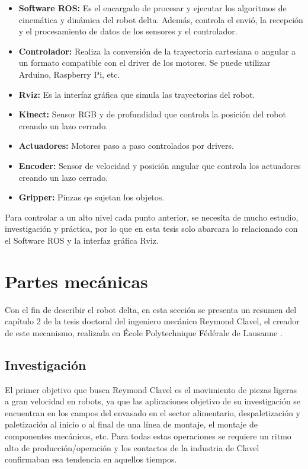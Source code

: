     \begin{itemize}
        \item \textbf{Software ROS:} Es el encargado de procesar y ejecutar los algoritmos de cinemática y dinámica del robot delta. Además, controla el envió, la recepción y el procesamiento de datos de los sensores y el controlador.
        \item \textbf{Controlador:} Realiza la conversión de la trayectoria cartesiana o angular a un formato compatible con el driver de los motores. Se puede utilizar Arduino, Raspberry Pi, etc.
        \item \textbf{Rviz:} Es la interfaz gráfica que simula las trayectorias del robot.
        \item \textbf{Kinect:} Sensor RGB y de profundidad que controla la posición del robot creando un lazo cerrado.
        \item \textbf{Actuadores:} Motores paso a paso controlados por drivers.
        \item \textbf{Encoder:} Sensor de velocidad y posición angular que controla los actuadores creando un lazo cerrado.
        \item \textbf{Gripper:} Pinzas qe sujetan los objetos.
    \end{itemize}
    
    Para controlar a un alto nivel cada punto anterior, se necesita de mucho estudio, investigación y práctica, por lo que en esta tesis solo abarcara lo relacionado con el Software ROS y la interfaz gráfica Rviz.  
    
    \newpage

    
\section{Partes mecánicas}
    Con el fin de describir el robot delta, en esta sección se presenta un resumen del capítulo 2 de la tesis doctoral del ingeniero mecánico Reymond Clavel, el creador de este mecanismo, realizada en École Polytechnique Fédérale de Lausanne \cite{Clavel:31403}. 

    
    \subsection{Investigación}
    El primer objetivo que busca Reymond Clavel es el movimiento de piezas ligeras a gran velocidad en robots, ya que las aplicaciones objetivo de su investigación se encuentran en los campos del envasado en el sector alimentario, despaletización y paletización al inicio o al final de una línea de montaje, el montaje de componentes mecánicos, etc. Para todas estas operaciones se requiere un ritmo alto de producción/operación y los contactos de la industria de Clavel confirmaban esa tendencia en aquellos tiempos.
    
